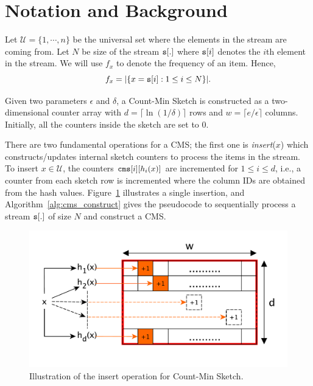 \documentclass[10pt, review=true,sigconf]{acmart}
\begin{document}
 \section{Notation and Background}\label{sec:not}

Let $\mathcal{U} = \{1,\cdots,n\}$ be the universal set where the elements in the stream are coming from. 
Let $N$ be size of the stream ${\tt s}[.]$ where ${\tt s}[i]$ denotes the $i$th element in the stream.
We will use $f_x$ to denote the frequency of an item. Hence, $$f_x = |\{x = {\tt s}[i]: 1 \leq i \leq N\}|.$$

Given two parameters $\epsilon$ and $\delta$, a Count-Min Sketch is constructed as a two-dimensional counter array with 
$d = \lceil \ln(1/\delta) \rceil$ rows and $w = \lceil e/\epsilon \rceil$ columns. Initially, all the counters inside the sketch are set to $0$. 

There are two fundamental operations for a CMS; the first one is {\em insert}($x$) which constructs/updates
 internal sketch counters to process the items in the stream. 
To insert $x \in \mathcal{U}$, the counters ${\tt cms}[i][h_i(x)]$ are incremented for $1 \leq i \leq d$, i.e., a counter from each sketch row is incremented where the column IDs are obtained from the hash values. Figure~\ref{fig:cms_insert} illustrates a single insertion, and Algorithm~\ref{alg:cms_construct} gives the pseudocode to sequentially process a stream ${\tt s}[.]$ of size $N$ and construct a CMS. 

 \begin{figure}[htbp]
\begin{center}
\includegraphics[width=0.90\linewidth]{cms.pdf}
\caption{Illustration of the insert operation for Count-Min Sketch.}
\label{fig:cms_insert}
\end{center}
\end{figure}
 
\end{document}
